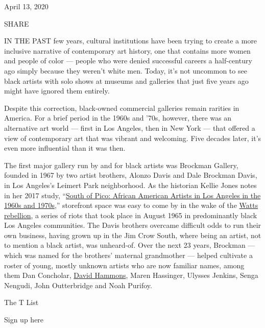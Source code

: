 April 13, 2020

SHARE

IN THE PAST few years, cultural institutions have been trying to create
a more inclusive narrative of contemporary art history, one that
contains more women and people of color --- people who were denied
successful careers a half-century ago simply because they weren't white
men. Today, it's not uncommon to see black artists with solo shows at
museums and galleries that just five years ago might have ignored them
entirely.

Despite this correction, black-owned commercial galleries remain
rarities in America. For a brief period in the 1960s and '70s, however,
there was an alternative art world --- first in Los Angeles, then in New
York --- that offered a view of contemporary art that was vibrant and
welcoming. Five decades later, it's even more influential than it was
then.

The first major gallery run by and for black artists was Brockman
Gallery, founded in 1967 by two artist brothers, Alonzo Davis and Dale
Brockman Davis, in Los Angeles's Leimert Park neighborhood. As the
historian Kellie Jones notes in her 2017 study,
``\href{https://read.dukeupress.edu/books/book/2349/South-of-PicoAfrican-American-Artists-in-Los}{South
of Pico: African American Artists in Los Angeles in the 1960s and
1970s},'' storefront space was easy to come by in the wake of the
\href{https://www.nytimes.com/2015/08/11/us/50-years-after-watts-riots-a-recovery-is-in-progress.html}{Watts
rebellion}, a series of riots that took place in August 1965 in
predominantly black Los Angeles communities. The Davis brothers overcame
difficult odds to run their own business, having grown up in the Jim
Crow South, where being an artist, not to mention a black artist, was
unheard-of. Over the next 23 years, Brockman --- which was named for the
brothers' maternal grandmother --- helped cultivate a roster of young,
mostly unknown artists who are now familiar names, among them Dan
Concholar,
\href{https://www.nytimes.com/2019/07/15/t-magazine/most-important-contemporary-art.html}{David
Hammons}, Maren Hassinger, Ulysses Jenkins, Senga Nengudi, John
Outterbridge and Noah Purifoy.

The T List \textbar{}

Sign up here

